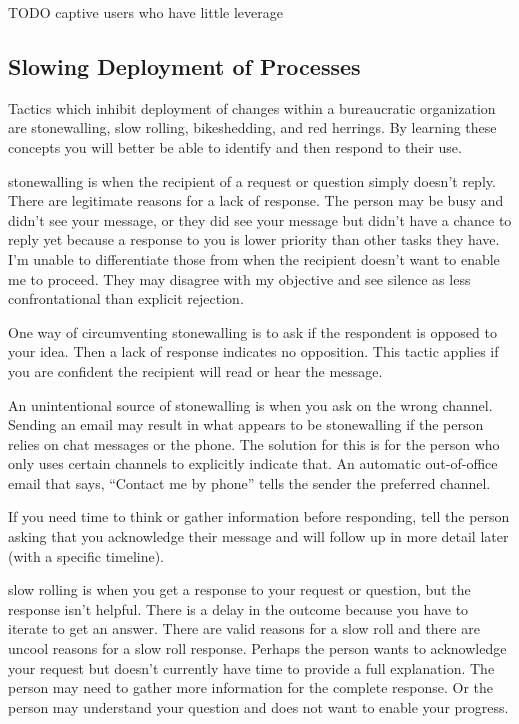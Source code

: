 TODO
captive users who have little leverage 


\subsection*{Slowing Deployment of Processes\label{sec:slow-deployment}}

Tactics which inhibit deployment of changes within a bureaucratic organization are stonewalling, slow rolling, bikeshedding, and red herrings. By learning these concepts you will better be able to identify and then respond to their use.

\Gls{stonewalling} is when the recipient of a request or question simply doesn't reply. There are legitimate reasons for a lack of response. The person may be busy and didn't see your message, or they did see your message but didn't have a chance to reply yet because a response to you is lower priority than other tasks they have. I'm unable to differentiate those from when the recipient doesn't want to enable me to proceed. They may disagree with my objective and see silence as less confrontational than explicit rejection. 

One way of circumventing stonewalling is to ask if the respondent is opposed to your idea. 
Then a lack of response indicates no opposition. This tactic applies if you are confident the recipient will read or hear the message.

An unintentional source of stonewalling is when you ask on the wrong channel. Sending an email may result in what appears to be stonewalling if the person relies on chat messages or the phone. The solution for this 
is for the person who only uses certain channels to explicitly indicate that. An automatic out-of-office email that says, ``Contact me by phone'' tells the sender the preferred channel.

If you need time to think or gather information before responding, 
tell the person asking that you acknowledge their message and will follow up in more detail later (with a specific timeline). 

\Gls{slow rolling} is when you get a response to your request or question, but the response isn't helpful. There is a delay in the outcome because you have to iterate to get an answer. There are valid reasons for a slow roll and there are uncool reasons for a slow roll response. Perhaps the person wants to acknowledge your request but doesn't currently have time to provide a full explanation. The person may need to gather more information for the complete response. Or the person may understand your question and does not want to enable your progress. 

